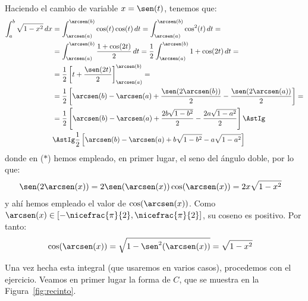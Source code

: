 \documentclass[12pt]{article}
\begin{document}
\begin{ejercicio}[5 puntos]
\begin{enumerate}
    Haciendo el cambio de variable $x=\sen(t)$, tenemos que:
    \begin{align}\label{eq:primitiva}
        \int_{a}^{b} \sqrt{1-x^2} \, dx &= \int_{\arcsen(a)}^{\arcsen(b)} \cos(t)\cos(t) \, dt
        = \int_{\arcsen(a)}^{\arcsen(b)} \cos^2(t) \, dt
        =\\\notag&= \int_{\arcsen(a)}^{\arcsen(b)} \dfrac{1+\cos(2t)}{2} \, dt
        = \dfrac{1}{2}\int_{\arcsen(a)}^{\arcsen(b)} 1+\cos(2t) \, dt
        =\\\notag&= \dfrac{1}{2}\left[t+\dfrac{\sen(2t)}{2}\right]_{\arcsen(a)}^{\arcsen(b)}
        =\\\notag&= \dfrac{1}{2}\left[\arcsen(b)-\arcsen(a)+\dfrac{\sen(2\arcsen(b))}{2}-\dfrac{\sen(2\arcsen(a))}{2}\right]
        =\\\notag&= \dfrac{1}{2}\left[\arcsen(b)-\arcsen(a)+\dfrac{2b\sqrt{1-b^2}}{2}-\dfrac{2a\sqrt{1-a^2}}{2}\right]
        \AstIg\\\notag&\AstIg \dfrac{1}{2}\left[\arcsen(b)-\arcsen(a)+b\sqrt{1-b^2}-a\sqrt{1-a^2}\right]
    \end{align}
    donde en ($\ast$) hemos empleado, en primer lugar, el seno del ángulo doble, por lo que:
    \begin{align*}
        \sen(2\arcsen(x)) &= 2\sen(\arcsen(x))\cos(\arcsen(x))
        = 2x\sqrt{1-x^2}
    \end{align*}
    y ahí hemos empleado el valor de $\cos(\arcsen(x))$. Como $\arcsen(x)\in \left[-\nicefrac{\pi}{2},\nicefrac{\pi}{2}\right]$, su coseno es positivo. Por tanto:
    \begin{align*}
        \cos(\arcsen(x)) &= \sqrt{1-\sen^2(\arcsen(x))} = \sqrt{1-x^2}
    \end{align*}

    Una vez hecha esta integral (que usaremos en varios casos), procedemos con el ejercicio.
    Veamos en primer lugar la forma de $C$, que se muestra en la Figura~\ref{fig:recinto}.
    \begin{figure}
        \centering
\end{figure}
\end{enumerate}
\end{ejercicio}
\end{document}
